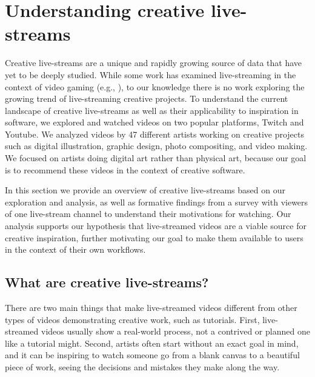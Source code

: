 \section{Understanding creative live-streams}
Creative live-streams are a unique and rapidly growing source of data that have yet to be deeply studied. While some work has examined live-streaming in the context of video gaming (e.g., \cite{Pan2016, Hamilton2014, Sjoblom2017}), to our knowledge there is no work exploring the growing trend of live-streaming creative projects. To understand the current landscape of creative live-streams as well as their applicability to inspiration in software, we explored and watched videos on two popular platforms, Twitch and Youtube. We analyzed videos by 47 different artists working on creative projects such as digital illustration, graphic design, photo compositing, and video making. We focused on artists doing digital art rather than physical art, because our goal is to recommend these videos in the context of creative software. 

In this section we provide an overview of creative live-streams based on our exploration and analysis, as well as formative findings from a survey with viewers of one live-stream channel to understand their motivations for watching. Our analysis supports our hypothesis that live-streamed videos are a viable source for creative inspiration, further motivating our goal to make them available to users in the context of their own workflows.

\addtocounter{footnote}{-4}

\subsection{What are creative live-streams?}
There are two main things that make live-streamed videos different from other types of videos demonstrating creative work, such as tutorials. First, live-streamed videos usually show a real-world process, not a contrived or planned one like a tutorial might. Second, artists often start without an exact goal in mind, and it can be inspiring to watch someone go from a blank canvas to a beautiful piece of work, seeing the decisions and mistakes they make along the way.

